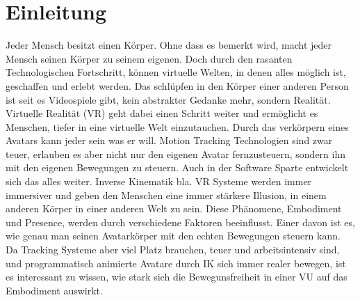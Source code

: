 \chapter{Einleitung}

Jeder Mensch besitzt einen Körper. Ohne dass es bemerkt wird, macht jeder Mensch seinen Körper zu seinem eigenen. Doch durch den rasanten Technologischen Fortschritt, können virtuelle Welten, in denen alles möglich ist, geschaffen und erlebt werden. Das schlüpfen in den Körper einer anderen Person ist seit es Videospiele gibt, kein abstrakter Gedanke mehr, sondern Realität. Virtuelle Realität (VR) geht dabei einen Schritt weiter und ermöglicht es Menschen, tiefer in eine virtuelle Welt einzutauchen. Durch das verkörpern eines Avatars kann jeder sein was er will. Motion Tracking Technologien sind zwar teuer, erlauben es aber nicht nur den eigenen Avatar fernzusteuern, sondern ihn mit den eigenen Bewegungen zu steuern. Auch in der Software Sparte entwickelt sich das alles weiter. Inverse Kinematik bla.
VR Systeme werden immer immersiver und geben den Menschen eine immer stärkere Illusion, in einem anderen Körper in einer anderen Welt zu sein. Diese Phänomene, Embodiment und Presence, werden durch verschiedene Faktoren beeinflusst. Einer davon ist es, wie genau man seinen Avatarkörper mit den echten Bewegungen steuern kann. Da Tracking Systeme aber viel Platz brauchen, teuer und arbeitsintensiv sind, und programmatisch animierte Avatare durch IK sich immer realer bewegen, ist es interessant zu wissen, wie stark sich die Bewegunsfreiheit in einer VU auf das Embodiment auswirkt. 


